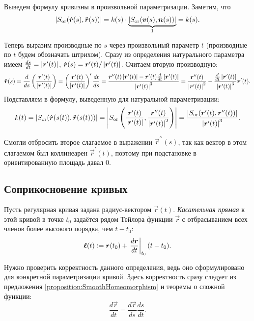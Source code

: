 Выведем формулу кривизны в произвольной параметризации. Заметим, что
\[
	\abs{S_{\Or}(\dot{\vec{r}}(s), \ddot{\vec{r}}(s))} = k(s) \cdot \underbrace{\abs{S_{\Or}(\vec{v}(s), \vec{n}(s))}}_1 = k(s).
\]

Теперь выразим производные по $s$ через произвольный параметр $t$ (производные по $t$ будем обозначать штрихом). Сразу из определения натурального параметра имеем $\frac{ds}{dt} \hm= \abs{\vec{r}^\prime(t)}$, $\dot{\vec{r}}(s) = \vec{r}^\prime(t) / \abs{\vec{r}^\prime(t)}$. Считаем вторую производную:
\[
	\ddot{\vec{r}}(s) = \frac{d}{ds}\br{\frac{\vec{r}^\prime(t)}{\abs{\vec{r}^\prime(t)}}} = \br{\frac{\vec{r}^\prime(t)}{\abs{\vec{r}^\prime(t)}}}^\prime \frac{dt}{ds} = \frac{\vec{r}^{\prime\prime}(t) \abs{\vec{r}^\prime(t)} - \vec{r}^\prime(t)\frac{d}{dt}\abs{\vec{r}^\prime(t)}}{\abs{\vec{r}^\prime(t)}^3} = \frac{\vec{r}^{\prime\prime}(t)}{\abs{\vec{r}^\prime(t)}^2} - \frac{\frac{d}{dt}\abs{\vec{r}^\prime(t)}}{\abs{\vec{r}^\prime(t)}^3}\vec{r}^\prime(t).
\]
Подставляем в формулу, выведенную для натуральной параметризации:
\begin{equation} \label{eq:CurvatureFormula}
	k(t) = \abs{S_{\Or}(\dot{\vec{r}}(s(t)), \ddot{\vec{r}}(s(t)))} = \abs{S_{\Or}\br{\frac{\vec{r}^\prime(t)}{\abs{\vec{r}^\prime(t)}}, \frac{\vec{r}^{\prime\prime}(t)}{\abs{\vec{r}^{\prime}(t)}^2}}} = \frac{\abs{S_{\Or}(\vec{r}^\prime(t), \vec{r}^{\prime\prime}(t))}}{\abs{\vec{r}^\prime(t)}^3}.
\end{equation}

Смогли отбросить второе слагаемое в выражении $\vec{r}^{\prime\prime}(s)$, так как вектор в этом слагаемом был коллинеарен $\vec{r}^\prime(t)$, поэтому при подстановке в ориентированную площадь давал $0$.

\subsection{Соприкосновение кривых}

\begin{definition}
	Пусть регулярная кривая задана радиус-вектором $\vec{r}(t)$. \textit{Касательная прямая} к этой кривой в точке $t_0$ задаётся рядом Тейлора функции $\vec{r}$ с отбрасыванием всех членов более высокого порядка, чем $t - t_0$:
	\[
		\vec{\ell}(t) \vcentcolon = \vec{r}(t_0) + \left.\frac{d\vec{r}}{dt}\right|_{t_0}(t - t_0).
	\]
\end{definition}

Нужно проверить корректность данного определения, ведь оно сформулировано для конкретной параметризации кривой. Здесь корректность сразу следует из предложения \ref{proposition:SmoothHomeomorphism} и теоремы о сложной функции:
\[
	\frac{d\vec{r}}{dt} = \frac{d\vec{r}}{ds} \frac{ds}{dt}.
\]

